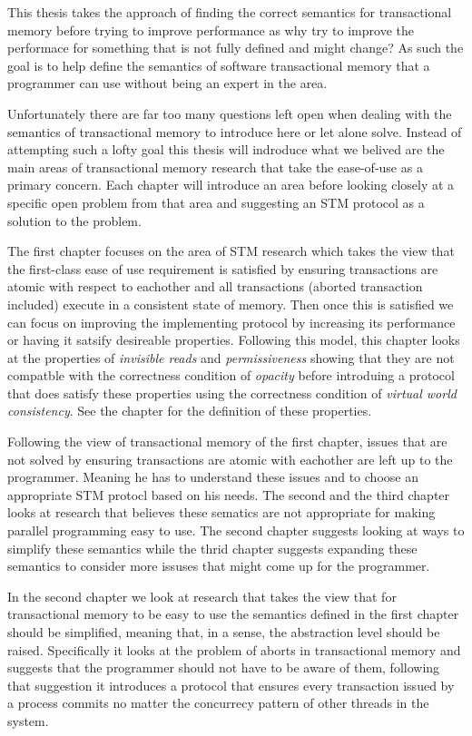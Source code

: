 This thesis takes the approach of finding the correct semantics for transactional
memory before trying to improve performance as why try to improve the performace
for something that is not fully defined and might change?
As such the goal is to help define the semantics of software transactional memory
that a programmer can use without being an expert in the area.

Unfortunately there are far too many questions left open when dealing
with the semantics of transactional memory to introduce here or let alone solve.
Instead of attempting such a lofty goal this thesis will indroduce what we
belived are the main areas of transactional memory research that take the
ease-of-use as a primary concern.
Each chapter will introduce an area before looking closely at a specific open
problem from that area and suggesting an STM protocol as a solution to the problem.

The first chapter focuses on the area of STM research which takes the view that
the first-class ease of use requirement is satisfied by ensuring transactions
are atomic with respect to eachother and all transactions (aborted transaction included)
execute in a consistent state of memory.
Then once this is satisfied we can focus on improving the implementing protocol
by increasing its performance or having it satsify desireable properties.
Following this model, this chapter looks at the properties of \emph{invisible reads} and
\emph{permissiveness} showing that they are not compatble with the correctness condition
of \emph{opacity} before introduing a protocol that does satisfy these properties using
the correctness condition of \emph{virtual world consistency}.
See the chapter for the definition of these properties.

Following the view of transactional memory of the first chapter,
issues that are not solved by ensuring transactions are atomic
with eachother are left up to the programmer.
Meaning he has to understand these issues and to choose an
appropriate STM protocl based on his needs.
The second and the third chapter looks at research that believes these sematics
are not appropriate for making parallel programming easy to use.
The second chapter suggests looking at ways to simplify these semantics
while the thrid chapter suggests expanding these semantics to consider more
issuses that might come up for the programmer.

In the second chapter we look at research that takes the view that for transactional memory to
be easy to use the semantics defined in the first chapter should be simplified, meaning that,
in a sense, the abstraction level should be raised.
Specifically it looks at the problem of aborts in transactional memory and suggests that
the programmer should not have to be aware of them, following that suggestion it introduces a protocol
that ensures every transaction issued by a process commits no matter the concurrecy pattern
of other threads in the system.

